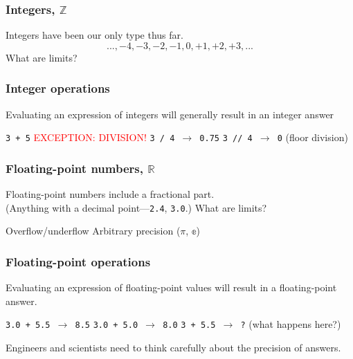 \documentclass[11pt]{beamer}
\begin{document}
\begin{frame}
  \frametitle{Integers, $\mathbb{Z}$}
  \Enlarge

  \begin{itemize}
  \myitem  Integers have been our only type thus far. \\
    $$ ..., -4, -3, -2, -1, 0, +1, +2, +3, ... $$
  \myitem  What are limits?
  \end{itemize}
\end{frame}

\begin{frame}
  \frametitle{Integer operations}
  \Enlarge

  \begin{itemize}
  \myitem  Evaluating an expression of integers will generally result in an integer answer
    \begin{itemize}
    \mysubitem  \texttt{3 + 5}
    \mysubitem  \textcolor{red}{EXCEPTION:  DIVISION!}
    \mysubitem  \texttt{3 / 4 $\rightarrow$ 0.75}
    \mysubitem  \texttt{3 // 4 $\rightarrow$ 0} (floor division)
    \end{itemize}
  \end{itemize}
\end{frame}

\begin{frame}
  \frametitle{Floating-point numbers, $\mathbb{R}$}
  \Enlarge

  \begin{itemize}
  \myitem  Floating-point numbers include a fractional part. \\
    \textcolor{CS101GradBot}{(Anything with a decimal point---\texttt{2.4}, \texttt{3.0}.)}
  \myitem  What are limits?
    \begin{itemize}
    \mysubitem  Overflow/underflow
    \mysubitem  Arbitrary precision ($\pi$, $\mathbb{e}$)
    \end{itemize}
  \end{itemize}
\end{frame}

\begin{frame}
  \frametitle{Floating-point operations}
  \Enlarge

  \begin{itemize}
  \myitem  Evaluating an expression of floating-point values will result in a floating-point answer.
    \begin{itemize}
    \mysubitem  \texttt{3.0 + 5.5 $\rightarrow$ 8.5}
    \mysubitem  \texttt{3.0 + 5.0 $\rightarrow$ 8.0}
    \mysubitem  \texttt{3   + 5.5 $\rightarrow$ ?} (what happens here?)
    \end{itemize}
  \myitem  Engineers and scientists need to think carefully about the precision of answers.
  \end{itemize}
\end{frame}
\end{document}
